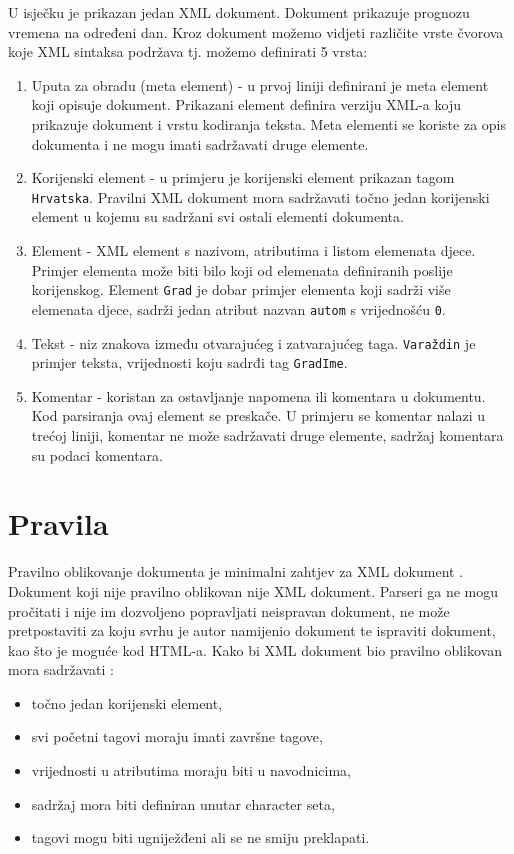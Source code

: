 \documentclass[]{foi}
\begin{document}
U isječku je prikazan jedan XML dokument. Dokument prikazuje prognozu vremena
na određeni dan. Kroz dokument možemo vidjeti različite vrste čvorova koje XML
sintaksa podržava tj. možemo definirati 5 vrsta:
\begin{enumerate}
	\item Uputa za obradu (meta element) - u prvoj liniji definirani je meta element koji
	      opisuje dokument. Prikazani element definira verziju XML-a koju prikazuje dokument
	      i vrstu kodiranja teksta. Meta elementi se koriste za opis dokumenta i ne mogu imati
	      sadržavati druge elemente.
	\item Korijenski element - u primjeru je korijenski element prikazan tagom \texttt{Hrvatska}.
	      Pravilni XML dokument mora sadržavati točno jedan korijenski element u kojemu su sadržani
	      svi ostali elementi dokumenta.
	\item Element - XML element s nazivom, atributima i listom elemenata djece. Primjer
	      elementa može biti bilo koji od elemenata definiranih poslije korijenskog. Element
	      \texttt{Grad} je dobar primjer elementa koji sadrži više elemenata djece, sadrži
	      jedan atribut nazvan \texttt{autom} s vrijednošću \texttt{0}.
	\item Tekst - niz znakova između otvarajućeg i zatvarajućeg taga. \texttt{Varaždin} je
	      primjer teksta, vrijednosti koju sadrđi tag \texttt{GradIme}.
	\item Komentar - koristan za ostavljanje napomena ili komentara u dokumentu. Kod parsiranja
	      ovaj element se preskače. U primjeru se komentar nalazi u trećoj liniji, komentar ne može
	      sadržavati druge elemente, sadržaj komentara su podaci komentara.
\end{enumerate}

\section{Pravila}
Pravilno oblikovanje dokumenta je minimalni zahtjev za XML dokument \cite{w3c_rec}.
Dokument koji nije pravilno oblikovan nije XML dokument. Parseri ga ne mogu pročitati i
nije im dozvoljeno popravljati neispravan dokument, ne može pretpostaviti za koju
svrhu je autor namijenio dokument te ispraviti dokument, kao što je moguće kod HTML-a.
Kako bi XML dokument bio pravilno oblikovan mora sadržavati \cite{process_xml}:
\begin{itemize}
	\item točno jedan korijenski element,
	\item svi početni tagovi moraju imati završne tagove,
	\item vrijednosti u atributima moraju biti u navodnicima,
	\item sadržaj mora biti definiran unutar character seta,
	\item tagovi mogu biti ugniježđeni ali se ne smiju preklapati.
\end{itemize}
\end{document}
